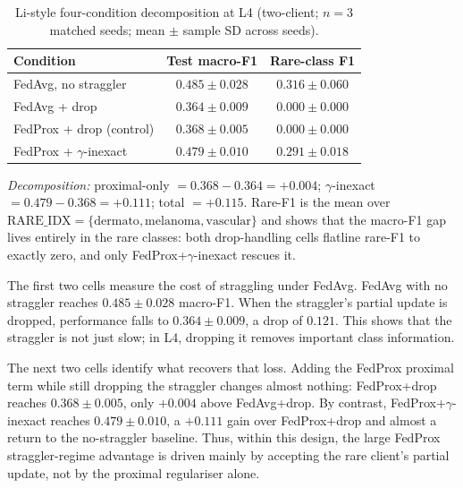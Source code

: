\documentclass[11pt,a4paper]{report}
\begin{document}
\begin{table}[H]
\centering
\caption{Li-style four-condition decomposition at L4 (two-client; $n=3$
matched seeds; mean $\pm$ sample SD across seeds).}
\label{tab:li-decomp-l4}
\small
\begin{tabular}{lcc}
\toprule
Condition                                       & Test macro-F1                & Rare-class F1 \\
\midrule
FedAvg, no straggler                            & $0.485 \pm 0.028$            & $0.316 \pm 0.060$ \\
FedAvg + drop                                   & $0.364 \pm 0.009$            & $0.000 \pm 0.000$ \\
FedProx + drop (control)                        & $0.368 \pm 0.005$            & $0.000 \pm 0.000$ \\
FedProx + $\gamma$-inexact                      & $\mathbf{0.479 \pm 0.010}$   & $\mathbf{0.291 \pm 0.018}$ \\
\bottomrule
\end{tabular}

\smallskip
\noindent\textit{Decomposition:} proximal-only $= 0.368 - 0.364 = +0.004$;
$\gamma$-inexact $= 0.479 - 0.368 = +0.111$; total $= +0.115$. Rare-F1 is
the mean over $\mathrm{RARE\_IDX} = \{\text{dermato}, \text{melanoma},
\text{vascular}\}$ and shows that the macro-F1 gap lives entirely in the
rare classes: both drop-handling cells flatline rare-F1 to exactly zero,
and only FedProx+$\gamma$-inexact rescues it.
\end{table}

The first two cells measure the cost of straggling under FedAvg. FedAvg with
no straggler reaches $0.485 \pm 0.028$ macro-F1. When the straggler's partial
update is dropped, performance falls to $0.364 \pm 0.009$, a drop of
$0.121$. This shows that the straggler is not just slow; in L4, dropping it
removes important class information.

The next two cells identify what recovers that loss. Adding the FedProx
proximal term while still dropping the straggler changes almost nothing:
FedProx+drop reaches $0.368 \pm 0.005$, only $+0.004$ above FedAvg+drop.
By contrast, FedProx+$\gamma$-inexact reaches $0.479 \pm 0.010$, a
$+0.111$ gain over FedProx+drop and almost a return to the no-straggler
baseline. Thus, within this design, the large FedProx straggler-regime
advantage is driven mainly by accepting the rare client's partial update,
not by the proximal regulariser alone.
\end{document}
